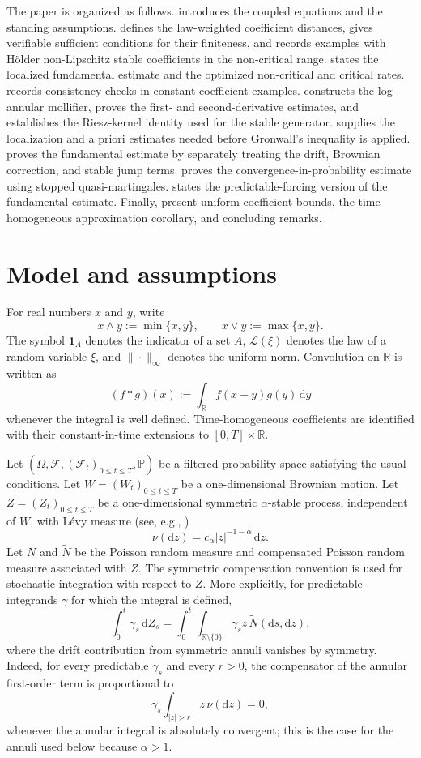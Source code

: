 \documentclass[11pt]{article}
\newcommand{\R}{\mathbb{R}}
\newcommand{\Pbb}{\mathbb{P}}
\newcommand{\F}{\mathcal{F}}
\newcommand{\1}{\mathbf{1}}
\newcommand{\dd}{\,\mathrm{d}}
\newcommand{\md}{\mathrm{d}}
\newcommand{\wt}{\tilde}
\begin{document}
The paper is organized as follows.  introduces the coupled equations and the standing assumptions.  defines the law-weighted coefficient distances, gives verifiable sufficient conditions for their finiteness, and records examples with H\"older non-Lipschitz stable coefficients in the non-critical range.  states the localized fundamental estimate and the optimized non-critical and critical rates.  records consistency checks in constant-coefficient examples.  constructs the log-annular mollifier, proves the first- and second-derivative estimates, and establishes the Riesz-kernel identity used for the stable generator.  supplies the localization and a priori estimates needed before Gronwall's inequality is applied.  proves the fundamental estimate by separately treating the drift, Brownian correction, and stable jump terms.  proves the convergence-in-probability estimate using stopped quasi-martingales.  states the predictable-forcing version of the fundamental estimate. Finally,  present uniform coefficient bounds, the time-homogeneous approximation corollary, and concluding remarks.


\section{Model and assumptions}
\label{sec:model}

For real numbers $x$ and $y$, write
\[
  x\wedge y:=\min\{x,y\},\qquad x\vee y:=\max\{x,y\}.
\]
The symbol $\1_A$ denotes the indicator of a set $A$, $\mathcal L(\xi)$ denotes the law of a random variable $\xi$, and $\|\cdot\|_\infty$ denotes the uniform norm. Convolution on $\R$ is written as
\[
  (f*g)(x):=\int_\R f(x-y)g(y)\dd y
\]
whenever the integral is well defined. Time-homogeneous coefficients are identified with their constant-in-time extensions to $[0,T]\times\R$.

Let $(\Omega,\F,(\F_t)_{0\le t\le T},\Pbb)$ be a filtered probability space satisfying the usual conditions. Let $W=(W_t)_{0\le t\le T}$ be a one-dimensional Brownian motion. Let $Z=(Z_t)_{0\le t\le T}$ be a one-dimensional symmetric $\alpha$-stable process, independent of $W$, with L\'evy measure (see, e.g., \cite{Applebaum2009})
\[
  \nu(\md z)=c_\alpha |z|^{-1-\alpha}\,\md z.
\]
Let $N$ and $\wt N$ be the Poisson random measure and compensated Poisson random measure associated with $Z$. The symmetric compensation convention is used for stochastic integration with respect to $Z$. More explicitly, for predictable integrands $\gamma$ for which the integral is defined,
\[
  \int_0^t \gamma_s\dd Z_s
  =\int_0^t\int_{\R\setminus\{0\}}\gamma_s z\,\wt N(\md s,\md z),
\]
where the drift contribution from symmetric annuli vanishes by symmetry. Indeed, for every predictable $\gamma_s$ and every $r>0$, the compensator of the annular first-order term is proportional to
\[
  \gamma_s\int_{|z|>r}z\,\nu(\md z)=0,
\]
whenever the annular integral is absolutely convergent; this is the case for the annuli used below because $\alpha>1$.
\end{document}
